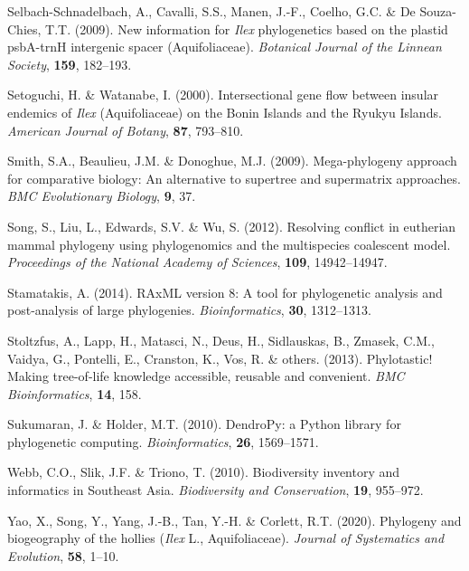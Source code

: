\documentclass[]{article}
\begin{document}
\leavevmode\hypertarget{ref-selbach2009new}{}%
Selbach-Schnadelbach, A., Cavalli, S.S., Manen, J.-F., Coelho, G.C. \& De Souza-Chies, T.T. (2009). New information for \emph{Ilex} phylogenetics based on the plastid psbA-trnH intergenic spacer (Aquifoliaceae). \emph{Botanical Journal of the Linnean Society}, \textbf{159}, 182--193.

\leavevmode\hypertarget{ref-setoguchi2000intersectional}{}%
Setoguchi, H. \& Watanabe, I. (2000). Intersectional gene flow between insular endemics of \emph{Ilex} (Aquifoliaceae) on the Bonin Islands and the Ryukyu Islands. \emph{American Journal of Botany}, \textbf{87}, 793--810.

\leavevmode\hypertarget{ref-smith2009mega}{}%
Smith, S.A., Beaulieu, J.M. \& Donoghue, M.J. (2009). Mega-phylogeny approach for comparative biology: An alternative to supertree and supermatrix approaches. \emph{BMC Evolutionary Biology}, \textbf{9}, 37.

\leavevmode\hypertarget{ref-song2012resolving}{}%
Song, S., Liu, L., Edwards, S.V. \& Wu, S. (2012). Resolving conflict in eutherian mammal phylogeny using phylogenomics and the multispecies coalescent model. \emph{Proceedings of the National Academy of Sciences}, \textbf{109}, 14942--14947.

\leavevmode\hypertarget{ref-stamatakis2014raxml}{}%
Stamatakis, A. (2014). RAxML version 8: A tool for phylogenetic analysis and post-analysis of large phylogenies. \emph{Bioinformatics}, \textbf{30}, 1312--1313.

\leavevmode\hypertarget{ref-stoltzfus2013phylotastic}{}%
Stoltzfus, A., Lapp, H., Matasci, N., Deus, H., Sidlauskas, B., Zmasek, C.M., Vaidya, G., Pontelli, E., Cranston, K., Vos, R. \& others. (2013). Phylotastic! Making tree-of-life knowledge accessible, reusable and convenient. \emph{BMC Bioinformatics}, \textbf{14}, 158.

\leavevmode\hypertarget{ref-sukumaran2010dendropy}{}%
Sukumaran, J. \& Holder, M.T. (2010). DendroPy: a Python library for phylogenetic computing. \emph{Bioinformatics}, \textbf{26}, 1569--1571.

\leavevmode\hypertarget{ref-webb2010biodiversity}{}%
Webb, C.O., Slik, J.F. \& Triono, T. (2010). Biodiversity inventory and informatics in Southeast Asia. \emph{Biodiversity and Conservation}, \textbf{19}, 955--972.

\leavevmode\hypertarget{ref-yao2020phylogeny}{}%
Yao, X., Song, Y., Yang, J.-B., Tan, Y.-H. \& Corlett, R.T. (2020). Phylogeny and biogeography of the hollies (\emph{Ilex} L., Aquifoliaceae). \emph{Journal of Systematics and Evolution}, \textbf{58}, 1--10.
\end{document}
